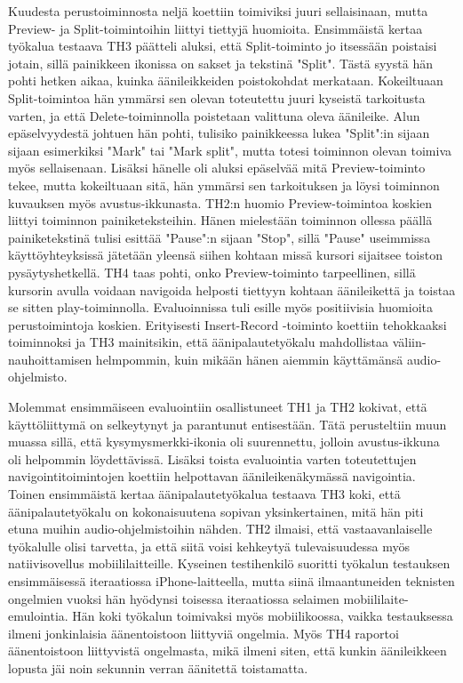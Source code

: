 \documentclass[utf8]{gradu3}
\begin{document}
Kuudesta perustoiminnosta neljä koettiin toimiviksi juuri sellaisinaan, mutta Preview- ja Split-toimintoihin liittyi tiettyjä huomioita. Ensimmäistä kertaa työkalua testaava TH3 päätteli aluksi, että Split-toiminto jo itsessään poistaisi jotain, sillä painikkeen ikonissa on sakset ja tekstinä "Split". Tästä syystä hän pohti hetken aikaa, kuinka äänileikkeiden poistokohdat merkataan. Kokeiltuaan Split-toimintoa hän ymmärsi sen olevan toteutettu juuri kyseistä tarkoitusta varten, ja että Delete-toiminnolla poistetaan valittuna oleva äänileike. Alun epäselvyydestä johtuen hän pohti, tulisiko painikkeessa lukea "Split":in sijaan sijaan esimerkiksi "Mark" tai "Mark split", mutta totesi toiminnon olevan toimiva myös sellaisenaan. Lisäksi hänelle oli aluksi epäselvää mitä Preview-toiminto tekee, mutta kokeiltuaan sitä, hän ymmärsi sen tarkoituksen ja löysi toiminnon kuvauksen myös avustus-ikkunasta. TH2:n huomio Preview-toimintoa koskien liittyi toiminnon painiketeksteihin. Hänen mielestään toiminnon ollessa päällä painiketekstinä tulisi esittää "Pause":n sijaan "Stop", sillä "Pause" useimmissa käyttöyhteyksissä jätetään yleensä siihen kohtaan missä kursori sijaitsee toiston pysäytyshetkellä. TH4 taas pohti, onko Preview-toiminto tarpeellinen, sillä kursorin avulla voidaan navigoida helposti tiettyyn kohtaan äänileikettä ja toistaa se sitten play-toiminnolla. Evaluoinnissa tuli esille myös positiivisia huomioita perustoimintoja koskien. Erityisesti Insert-Record -toiminto koettiin tehokkaaksi toiminnoksi ja TH3 mainitsikin, että äänipalautetyökalu mahdollistaa väliin-nauhoittamisen helmpommin, kuin mikään hänen aiemmin käyttämänsä audio-ohjelmisto.

Molemmat ensimmäiseen evaluointiin osallistuneet TH1 ja TH2 kokivat, että käyttöliittymä on selkeytynyt ja parantunut entisestään. Tätä perusteltiin muun muassa sillä, että kysymysmerkki-ikonia oli suurennettu, jolloin avustus-ikkuna oli helpommin löydettävissä. Lisäksi toista evaluointia varten toteutettujen navigointitoimintojen koettiin helpottavan äänileikenäkymässä navigointia. Toinen ensimmäistä kertaa äänipalautetyökalua testaava TH3 koki, että äänipalautetyökalu on kokonaisuutena sopivan yksinkertainen, mitä hän piti etuna muihin audio-ohjelmistoihin nähden. TH2 ilmaisi, että vastaavanlaiselle työkalulle olisi tarvetta, ja että siitä voisi kehkeytyä tulevaisuudessa myös natiivisovellus mobiililaitteille. Kyseinen testihenkilö suoritti työkalun testauksen ensimmäisessä iteraatiossa iPhone-laitteella, mutta siinä ilmaantuneiden teknisten ongelmien vuoksi hän hyödynsi toisessa iteraatiossa selaimen mobiililaite-emulointia. Hän koki työkalun toimivaksi myös mobiilikoossa, vaikka testauksessa ilmeni jonkinlaisia äänentoistoon liittyviä ongelmia. Myös TH4 raportoi äänentoistoon liittyvistä ongelmasta, mikä ilmeni siten, että kunkin äänileikkeen lopusta jäi noin sekunnin verran äänitettä toistamatta.
\end{document}
